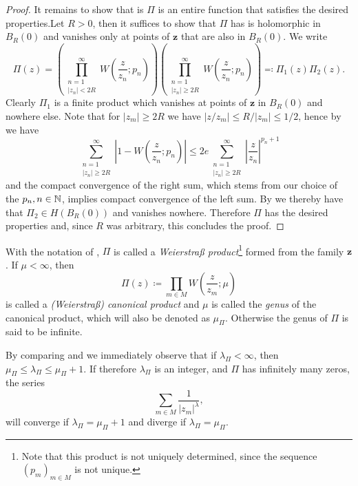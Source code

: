 \begin{proof}
    It remains to show that is $\Pi$ is an entire function that satisfies the desired properties.Let $R > 0$, then it suffices to show that $\Pi$ has is holomorphic in $B_R(0)$ and vanishes only at points of $\mathbf{z}$ that are also in $B_R(0)$. We write
    $$ \Pi(z) = \left( \prod_{\substack{n=1 \\ \vert z_n \vert < 2R }}^\infty W\left(\frac{z}{z_n}; p_n\right) \right) \left( \prod_{\substack{n=1 \\ \vert z_n \vert \geq 2R }}^\infty W\left(\frac{z}{z_n}; p_n\right) \right) \eqqcolon \Pi_1(z) \Pi_2(z). $$
    Clearly $\Pi_1$ is a finite product which vanishes at points of $\mathbf{z}$ in $B_R(0)$ and nowhere else. Note that for $\vert z_m \vert \geq 2R$ we have $\vert z / z_m \vert \leq R / \vert z_m \vert \leq 1 / 2$, hence by  we have
    $$ \sum_{\substack{n=1 \\ \vert z_n \vert \geq 2R }}^\infty \left\vert 1 - W\left(\frac{z}{z_n}; p_n\right) \right\vert \leq 2e \sum_{\substack{n=1 \\ \vert z_n \vert \geq 2R }}^\infty \left\vert \frac{z}{z_n} \right\vert^{p_n + 1} $$
    and the compact convergence of the right sum, which stems from our choice of the $p_n, n \in \mathbb{N}$, implies compact convergence of the left sum. By  we thereby have that $\Pi_2 \in H(B_R(0))$ and vanishes nowhere. Therefore $\Pi$ has the desired properties and, since $R$ was arbitrary, this concludes the proof.
\end{proof}

\begin{definition} \label{def:canonical-product}
    With the notation of , $\Pi$ is called a \emph{Weierstraß product}\footnote{Note that this product is not uniquely determined, since the sequence $(p_m)_{m \in M}$ is not unique.} formed from the family $\mathbf{z}$. If $\mu < \infty$, then
    \begin{equation}
        \Pi(z) \coloneqq \prod_{m \in M} W\left(\frac{z}{z_m}; \mu \right)
    \end{equation}
    is called a \emph{(Weierstraß) canonical product} and $\mu$ is called the \emph{genus} of the canonical product, which will also be denoted as $\mu_\Pi$. Otherwise the genus of $\Pi$ is said to be infinite.
\end{definition}

\begin{remark}
    By comparing  and  we immediately observe that if $\lambda_\Pi < \infty$, then $\mu_\Pi \leq \lambda_\Pi \leq \mu_\Pi + 1$. If therefore $\lambda_\Pi$ is an integer, and $\Pi$ has infinitely many zeros, the series
    $$ \sum_{m \in M} \frac{1}{\vert z_m \vert^{\lambda}}, $$
    will converge if $\lambda_\Pi = \mu_\Pi + 1$ and diverge if $\lambda_\Pi = \mu_\Pi$.
\end{remark}

